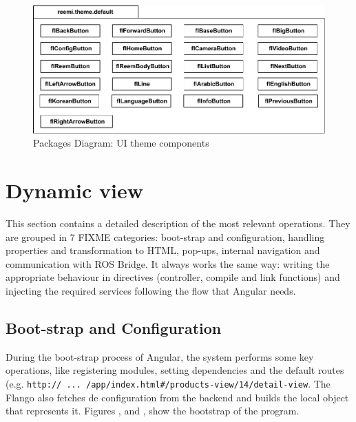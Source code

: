 \begin{figure}[htb]
    \centering
    \includegraphics{figures/design-package-uithemecomponents.pdf}
    \caption{Packages Diagram: UI theme components}
    \label{fig:pkg-themecomponents}
\end{figure}

\FloatBarrier

\section{Dynamic view}
This section contains a detailed description of the most relevant operations.
They are grouped in 7 FIXME categories: boot-strap and configuration, handling properties and transformation to \ac{HTML}, pop-ups, internal navigation and communication with ROS Bridge.
It always works the same way: writing the appropriate behaviour in directives (controller, compile and link functions) and injecting the required services following the flow that Angular needs.

\subsection{Boot-strap and Configuration}
During the boot-strap process of Angular, the system performs some key operations, like registering modules, setting dependencies and the default routes \\ (e.g. \texttt{http:// ... /app/index.html\#/products-view/14/detail-view}.
The Flango \cm also fetches de configuration from the backend and builds the local object that represents it.
Figures ,  and , show the bootstrap of the program.

